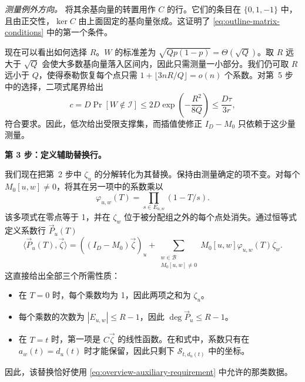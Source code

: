 \documentclass[11pt,reqno]{amsart}
\numberwithin{equation}{section}
\theoremstyle{definition}\newtheorem{definition}[theorem]{定义}
\theoremstyle{remark}\newtheorem{remark}[theorem]{注}
\renewcommand{\le}{\leqslant}
\begin{document}
\smallskip\noindent
\emph{测量例外方向。}
将其余基向量的转置用作 $C$ 的行。它们的条目在 $\{0,1,-1\}$ 中，且由正交性，$\ker C$ 由上面固定的基向量张成。这证明了 \eqref{eq:outline-matrix-conditions} 中的第一个条件。

现在可以看出如何选择 $R$。$W$ 的标准差为 $\sqrt{Qp(1-p)}=\Theta(\sqrt Q)$。取 $R$ 远大于 $\sqrt Q$ 会使大多数基向量落入区间内，因此只需测量一小部分。我们仍可取 $R$ 远小于 $Q$，使得泰勒恢复每个点只需 $1+\lfloor 3nR/Q\rfloor=o(n)$ 个系数。对第~5 步中的选择，二项式尾界给出
\[
 c=D\Pr[W\notin\mathcal I]
      \le 2D\exp\!\left(-\frac{R^2}{8Q}\right)
      \le\frac{D\tau}{3r},
\]
符合要求。因此，低次给出受限支撑集，而插值使修正 $I_D-M_0$ 只依赖于这少量测量。

\medskip\noindent
\textbf{第 3 步：定义辅助替换行。}\par\nobreak
\smallskip\noindent
我们现在把第~2 步中 $\zeta_u$ 的分解转化为其替换。保持由测量确定的项不变。对每个 $M_0[u,w]\ne0$，将其在另一项中的系数乘以
\[
 \varphi_{u,w}(T)=\prod_{s\in E_{u,w}}(1-T/s).
\]
该多项式在零点等于 1，并在 $\zeta_w$ 位于被分配组之外的每个点处消失。通过恒等式定义系数行 $\vec P_u(T)$
\begin{equation}\label{eq:outline-auxiliary-row}
 \langle\vec P_u(T),\vec\zeta\rangle
 =((I_D-M_0)\vec\zeta)_u+
   \sum_{\substack{w\in\mathcal B\\M_0[u,w]\ne0}}
                M_0[u,w]\varphi_{u,w}(T)\zeta_w.
\end{equation}
这直接给出全部三个所需性质：
\begin{itemize}
\item 在 $T=0$ 时，每个乘数均为 1，因此两项之和为 $\zeta_u$。
\item 每个乘数的次数为 $|E_{u,w}|\le R-1$，因此 $\deg\vec P_u\le R-1$。
\item 在 $T=t$ 时，第一项是 $C\vec\zeta$ 的线性函数。在和式中，系数只有在 $a_w(t)=d_u(t)$ 时才能保留，因此只剩下 $\mathcal S_{t,d_u(t)}$ 中的坐标。
\end{itemize}
因此，该替换恰好使用 \eqref{eq:overview-auxiliary-requirement} 中允许的那类数据。
\end{document}
